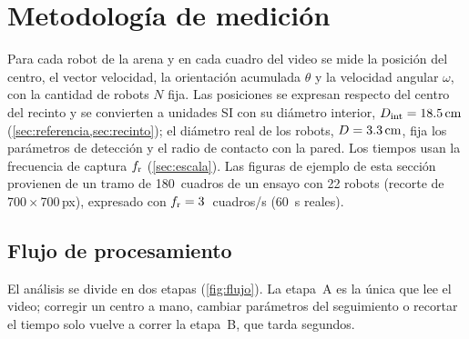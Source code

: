 \section{Metodología de medición}\label{sec:metodo}

Para cada robot de la arena y en cada cuadro del video se mide la posición del centro, el vector
velocidad, la orientación acumulada $\theta$ y la velocidad angular $\omega$, con la cantidad de robots
$N$ fija. Las posiciones se expresan respecto del centro del recinto y se convierten a unidades SI con
su diámetro interior, $D_{\mathrm{int}} = \SI{18.5}{\centi\metre}$ (\cref{sec:referencia,sec:recinto});
el diámetro real de los robots, $D = \SI{3.3}{\centi\metre}$, fija los parámetros de
detección y el radio de contacto con la pared. Los tiempos usan la frecuencia de captura $f_{\mathrm{r}}$
(\cref{sec:escala}). Las figuras de ejemplo de esta sección provienen de un tramo de
\num{180}~cuadros de un ensayo con 22 robots (recorte de \num{700}\,$\times$\,\num{700}\,px),
expresado con $f_{\mathrm{r}} = 3$~cuadros/s (\SI{60}{\second} reales).

\subsection{Flujo de procesamiento}

El análisis se divide en dos etapas (\cref{fig:flujo}). La etapa~A es la única que lee el video;
corregir un centro a mano, cambiar parámetros del seguimiento o recortar el tiempo solo vuelve a correr
la etapa~B, que tarda segundos.

